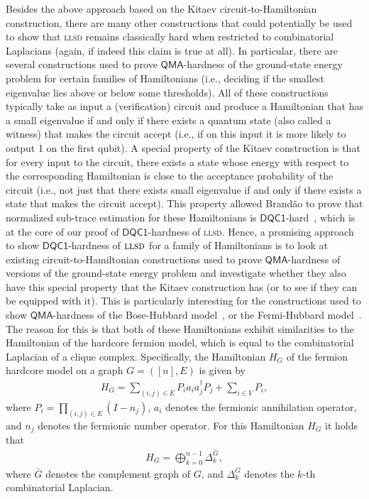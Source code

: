\documentclass[a4paper, onecolumn, accepted=2022-08-28]{quantumarticle}
\begin{document}
Besides the above approach based on the Kitaev circuit-to-Hamiltonian construction, there are many other constructions that could potentially be used to show that \textsc{llsd} remains classically hard when restricted to combinatorial Laplacians (again, if indeed this claim is true at all).
In particular, there are several constructions used to prove $\mathsf{QMA}$-hardness of the ground-state energy problem for certain families of Hamiltonians (i.e., deciding if the smallest eigenvalue lies above or below some thresholds)\footnotemark[2].
%
All of these constructions typically take as input a (verification) circuit and produce a Hamiltonian that has a small eigenvalue if and only if there exists a quantum state (also called a witness) that makes the circuit accept (i.e., if on this input it is more likely to output 1 on the first qubit).
A special property of the Kitaev construction is that for every input to the circuit, there exists a state whose energy with respect to the corresponding Hamiltonian is close to the acceptance probability of the circuit (i.e., not just that there exists small eigenvalue if and only if there exists a state that makes the circuit accept).
This property allowed Brand\~{a}o to prove that normalized sub-trace estimation for these Hamiltonians is $\mathsf{DQC1}$-hard~\cite{brandao:thesis}, which is at the core of our proof of $\mathsf{DQC1}$-hardness of \textsc{llsd}.
Hence, a promising approach to show $\mathsf{DQC1}$-hardness of $\textsc{llsd}$ for a family of Hamiltonians is to look at existing circuit-to-Hamiltonian constructions used to prove $\mathsf{QMA}$-hardness of versions of the ground-state energy problem and investigate whether they also have this special property that the Kitaev construction has (or to see if they can be equipped with it).
This is particularly interesting for the constructions used to show $\mathsf{QMA}$-hardness of the Bose-Hubbard model~\cite{childs:bose}, or the Fermi-Hubbard model~\cite{gorman:fermi}.
The reason for this is that both of these Hamiltonians exhibit similarities to the Hamiltonian of the hardcore fermion model, which is equal to the combinatorial Laplacian of a clique complex.
Specifically, the Hamiltonian $H_G$ of the fermion hardcore model on a graph $G=([n], E)$ is given by
\begin{align}
\label{eq:ham_fermion}
H_G = \sum_{(i, j) \in E}P_i a_i a_j^\dagger P_j + \sum_{i \in V}P_i,
\end{align}
where $P_i = \prod_{(i, j) \in E}(I - n_j)$,  $a_i$ denotes the fermionic annihilation operator, and $n_j$ denotes the fermionic number operator.
For this Hamiltonian $H_G$ it holds that 
\begin{align}
    H_{G} = \bigoplus_{k=0}^{n-1}\Delta_k^{\bar{G}},
    \label{eq:ham_fermion_comb_lapl}
\end{align}
where $\bar{G}$ denotes the complement graph of $G$, and $\Delta_k^G$ denotes the $k$-th combinatorial Laplacian.
\end{document}
